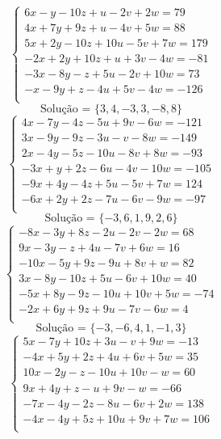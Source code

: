 \documentclass[12pt,oneside,a4paper]{article}
\begin{document}
\vspace{\baselineskip}
\begin{equation*}
\begin{cases}
6x-y-10z+u-2v+2w=79 \\
4x+7y+9z+u-4v+5w=88 \\
5x+2y-10z+10u-5v+7w=179 \\
-2x+2y+10z+u+3v-4w=-81 \\
-3x-8y-z+5u-2v+10w=73 \\
-x-9y+z-4u+5v-4w=-126 \\
\end{cases}
\end{equation*}
\begin{equation*}
\text{Solução = }\{3,4,-3,3,-8,8\}
\end{equation*}
\vspace{\baselineskip}
\begin{equation*}
\begin{cases}
4x-7y-4z-5u+9v-6w=-121 \\
3x-9y-9z-3u-v-8w=-149 \\
2x-4y-5z-10u-8v+8w=-93 \\
-3x+y+2z-6u-4v-10w=-105 \\
-9x+4y-4z+5u-5v+7w=124 \\
-6x+2y+2z-7u-6v-9w=-97 \\
\end{cases}
\end{equation*}
\begin{equation*}
\text{Solução = }\{-3,6,1,9,2,6\}
\end{equation*}
\vspace{\baselineskip}
\begin{equation*}
\begin{cases}
-8x-3y+8z-2u-2v-2w=68 \\
9x-3y-z+4u-7v+6w=16 \\
-10x-5y+9z-9u+8v+w=82 \\
3x-8y-10z+5u-6v+10w=40 \\
-5x+8y-9z-10u+10v+5w=-74 \\
-2x+6y+9z+9u-7v-6w=4 \\
\end{cases}
\end{equation*}
\begin{equation*}
\text{Solução = }\{-3,-6,4,1,-1,3\}
\end{equation*}
\vspace{\baselineskip}
\begin{equation*}
\begin{cases}
5x-7y+10z+3u-v+9w=-13 \\
-4x+5y+2z+4u+6v+5w=35 \\
10x-2y-z-10u+10v-w=60 \\
9x+4y+z-u+9v-w=-66 \\
-7x-4y-2z-8u-6v+2w=138 \\
-4x-4y+5z+10u+9v+7w=106 \\
\end{cases}
\end{equation*}
\end{document}
